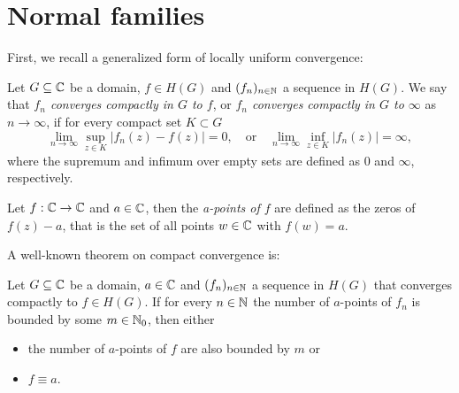 \section{Normal families}
\label{sec:normal-families}

First, we recall a generalized form of locally uniform convergence:

\begin{definition}
    Let $G \subseteq \mathbb{C}$ be a domain, $f \in H(G)$ and $(f_n)_{n \in \mathbb{N}}$ a sequence in $H(G)$. We say that \emph{$f_n$ converges compactly in $G$ to $f$}, or \emph{$f_n$ converges compactly in $G$ to $\infty$} as $n \to \infty$, if for every compact set $K \subset G$
    \begin{equation}
        \lim_{n \to \infty} \sup_{z \in K} \vert f_n(z) - f(z) \vert = 0, \quad \textrm{or} \quad \lim_{n \to \infty} \inf_{z \in K} \vert f_n(z) \vert = \infty,
    \end{equation}
    where the supremum and infimum over empty sets are defined as $0$ and $\infty$, respectively.
\end{definition}


\begin{definition}
    Let $f : \mathbb{C} \to \mathbb{C}$ and $a \in \mathbb{C}$, then the \emph{a-points of $f$} are defined as the zeros of $f(z) - a$, that is the set of all points $w \in \mathbb{C}$ with $f(w) = a$.
\end{definition}

A well-known theorem on compact convergence is:

\begin{theorem}[Hurwitz] \label{thm:hurwitz}
    Let $G \subseteq \mathbb{C}$ be a domain, $a \in \mathbb{C}$ and $(f_n)_{n \in \mathbb{N}}$ a sequence in $H(G)$ that converges compactly to $f \in H(G)$. If for every $n \in \mathbb{N}$ the number of $a$-points of $f_n$ is bounded by some $m \in \mathbb{N}_0$, then either
    \begin{itemize}
        \item the number of $a$-points of $f$ are also bounded by $m$ or
        \item $f \equiv a$.
    \end{itemize}
\end{theorem}

